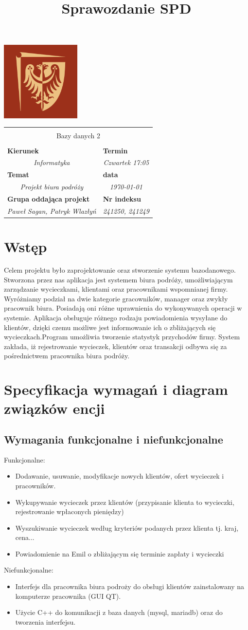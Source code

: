 \documentclass[polish,polish,a4paper]{article}
\title{Sprawozdanie SPD}
\newcommand{\name}[1]{\sffamily\bfseries\scriptsize #1}
\newcommand{\frontpage}[8]{

\hfill\includegraphics[width=4cm]{PWr.png}
\vspace{2cm}

\begin{tabular}{|p{0.72\textwidth}|p{0.28\textwidth}|}
\hline
\multicolumn{2}{|c|}{}\\
\multicolumn{2}{|c|}{{\LARGE #1}}\\
\multicolumn{2}{|c|}{}\\
\hline
\name{Kierunek} & \name{Termin}\\
\multicolumn{1}{|c|}{\textit{#2}} & \multicolumn{1}{|c|}{\textit{#3}} \\
\hline
\name{Temat} & \name{data}\\
\multicolumn{1}{|c|}{\textit{#4}} & \multicolumn{1}{|c|}{\textit{#5}} \\
\hline
\name{Grupa oddająca projekt} & \name{Nr indeksu}\\
\multicolumn{1}{|c|}{\textit{#6}} & \multicolumn{1}{|c|}{\textit{#7}} \\
\hline
\end{tabular}
}
\begin{document}
\frontpage{Bazy danych 2}{Informatyka}{Czwartek 17:05}{Projekt biura podróży}{\today}{Paweł Sagan, Patryk Wlazłyń}{241250, 241249}
\pagestyle{}
\newpage
\section{Wstęp}
Celem projektu było zaprojektowanie oraz stworzenie systemu bazodanowego. Stworzona przez nas aplikacja jest systemem biura podróży, umożliwiającym zarządzanie wycieczkami, klientami oraz pracownikami wspomnianej firmy. Wyróżniamy podział na dwie kategorie gracowników, manager oraz zwykły pracownik biura. Posiadają oni różne uprawnienia do wykonywanych operacji w systemie. Aplikacja obsługuje różnego rodzaju powiadomienia wysyłane do klientów, dzięki czemu możliwe jest informowanie ich o zbliżających się wycieczkach.Program umożliwia tworzenie statystyk przychodów firmy. System zakłada, iż rejestrowanie wycieczek, klientów oraz transakcji odbywa się za pośrednictwem pracownika biura podróży.
\section{Specyfikacja wymagań i diagram związków encji}
\subsection{Wymagania funkcjonalne i niefunkcjonalne}

Funkcjonalne:
\begin{itemize}
  \item Dodawanie, usuwanie, modyfikacje nowych klientów, ofert wycieczek i pracowników.
  \item Wykupywanie wycieczek przez klientów (przypisanie klienta to wycieczki, rejestrowanie wpłaconych pieniędzy)
  \item Wyszukiwanie wycieczek według kryteriów podanych przez klienta tj. kraj, cena...
  \item Powiadomienie na Emil o zbliżającym się terminie zapłaty i wycieczki
\end{itemize}
Niefunkcjonalne:
\begin{itemize}
  \item Interfejs dla pracownika biura podroży do obsługi klientów zainstalowany na komputerze pracownika (GUI QT).
  \item Użycie C++ do komunikacji z baza danych (mysql, mariadb) oraz do tworzenia interfejsu.
\end{itemize}
\end{document}

